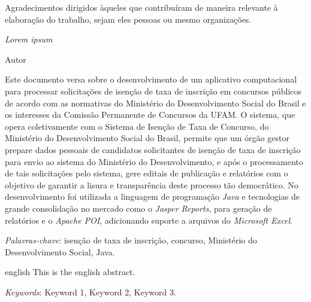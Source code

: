 \documentclass[
	12pt,			%
	openright,		%
	oneside,	
	a4paper,		%
	english,		%
	brazil			%
]{abntex2/abntex2}  %
\begin{document}
\begin{agradecimentos}

Agradecimentos dirigidos àqueles que contribuíram de maneira relevante à elaboração do trabalho, sejam eles pessoas ou mesmo organizações.

\end{agradecimentos}

\begin{epigrafe}
    \vspace*{\fill}
	\begin{flushright}
		\textit{Lorem ipsum}

		Autor
	\end{flushright}\vspace{4cm}
\end{epigrafe}


\setlength{\absparsep}{18pt} %
\begin{resumo}

	Este documento versa sobre o desenvolvimento de um aplicativo computacional para processar solicitações de isenção de taxa de inscrição em concursos públicos de acordo com as normativas do Ministério do Desenvolvimento Social do Brasil e os interesses da Comissão Permanente de Concursos da UFAM. O sistema, que opera coletivamente com o Sistema de Isenção de Taxa de Concurso, do Ministério do Desenvolvimento Social do Brasil, permite que um órgão gestor prepare dados pessoais de candidatos solicitantes de isenção de taxa de inscrição para envio ao sistema do Ministério do Desenvolvimento, e após o processamento de tais solicitações pelo sistema, gere editais de publicação e relatórios com o objetivo de garantir a lisura e transparência deste processo tão democrático. No desenvolvimento foi utilizada a linguagem de programação \textit{Java} e tecnologias de grande consolidação no mercado como o \textit{Jasper Reports}, para geração de relatórios e o \textit{Apache POI}, adicionando suporte a arquivos do \textit{Microsoft Excel}.

	\textit{Palavras-chave}: isenção de taxa de inscrição, concurso, Ministério do Desenvolvimento Social, Java.

\end{resumo}

\begin{resumo}[Abstract]
 \begin{otherlanguage*}{english}
   This is the english abstract.

   \vspace{\onelineskip}
 
   \noindent 
   \textit{Keywords}: Keyword 1, Keyword 2, Keyword 3.
 \end{otherlanguage*}
\end{resumo}
\end{document}
